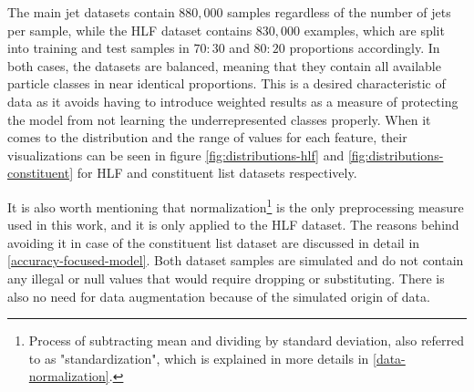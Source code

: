 The main jet datasets contain \(880,000\) samples regardless of the number of jets per sample, while the HLF dataset contains \(830,000\) examples, which are split into training and test samples in \(70:30\) and \(80:20\) proportions accordingly. In both cases, the datasets are balanced, meaning that they contain all available particle classes in near identical proportions. This is a desired characteristic of data as it avoids having to introduce weighted results as a measure of protecting the model from not learning the underrepresented classes properly. When it comes to the distribution and the range of values for each feature, their visualizations can be seen in figure \ref{fig:distributions-hlf} \cite{87-openml2022hls4ml} and \ref{fig:distributions-constituent} for HLF and constituent list datasets respectively.

It is also worth mentioning that normalization\footnote{Process of subtracting mean and dividing by standard deviation, also referred to as "standardization", which is explained in more details in \cref{data-normalization}.} is the only preprocessing measure used in this work, and it is only applied to the HLF dataset. The reasons behind avoiding it in case of the constituent list dataset are discussed in detail in \cref{accuracy-focused-model}. Both dataset samples are simulated and do not contain any illegal or null values that would require dropping or substituting. There is also no need for data augmentation because of the simulated origin of data.